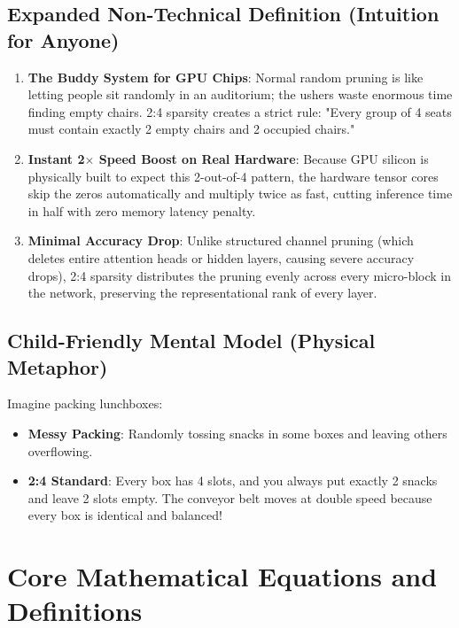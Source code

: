 \documentclass[11pt,a4paper]{article}
\theoremstyle{definition}
\begin{document}
\subsection{Expanded Non-Technical Definition (Intuition for Anyone)}
\begin{enumerate}
    \item \textbf{The Buddy System for GPU Chips}: Normal random pruning is like letting people sit randomly in an auditorium; the ushers waste enormous time finding empty chairs. 2:4 sparsity creates a strict rule: "Every group of 4 seats must contain exactly 2 empty chairs and 2 occupied chairs."
    \item \textbf{Instant 2$\times$ Speed Boost on Real Hardware}: Because GPU silicon is physically built to expect this 2-out-of-4 pattern, the hardware tensor cores skip the zeros automatically and multiply twice as fast, cutting inference time in half with zero memory latency penalty.
    \item \textbf{Minimal Accuracy Drop}: Unlike structured channel pruning (which deletes entire attention heads or hidden layers, causing severe accuracy drops), 2:4 sparsity distributes the pruning evenly across every micro-block in the network, preserving the representational rank of every layer.
\end{enumerate}

\subsection{Child-Friendly Mental Model (Physical Metaphor)}
Imagine packing lunchboxes:
\begin{itemize}
    \item \textbf{Messy Packing}: Randomly tossing snacks in some boxes and leaving others overflowing.
    \item \textbf{2:4 Standard}: Every box has 4 slots, and you always put exactly 2 snacks and leave 2 slots empty. The conveyor belt moves at double speed because every box is identical and balanced!
\end{itemize}

\section{Core Mathematical Equations and Definitions}
\end{document}
